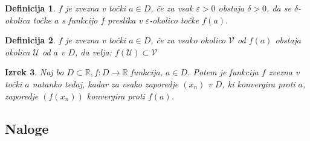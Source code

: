 \documentclass[a4paper,12pt]{report}
\newtheorem{izrek}{Izrek}[section]
\newtheorem{definicija}[izrek]{Definicija}
\begin{document}
\begin{definicija}
    $f$ je zvezna v točki $a \in D$, če za vsak $\varepsilon > 0$ obstaja $\delta > 0$, 
    da se $\delta$-okolica točke $a$ s funkcijo $f$ preslika v $\varepsilon$-okolico točke $f(a)$.
\end{definicija}

\begin{definicija}
    $f$ je zvezna v točki $a \in D$, če za vsako okolico $\mathcal{V}$ od $f(a)$ obstaja okolica 
    $\mathcal{U}$ od $a$ v $D$, da velja: $f(\mathcal{U}) \subset \mathcal{V}$
\end{definicija}


\begin{izrek}
    Naj bo $D \subset \mathbb{R}, f: D \to \mathbb{R}$ funkcija, $a \in D$. Potem je funkcija $f$ 
    zvezna v točki $a$ natanko tedaj, kadar za vsako zaporedje $(x_n)$ v $D$, ki konvergira proti $a$, 
    zaporedje $(f(x_n))$ konvergira proti $f(a)$.
\end{izrek}

\subsection*{Naloge}
\end{document}
